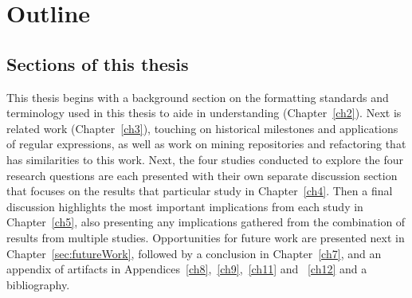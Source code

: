 \section{Outline}

\subsection{Sections of this thesis}
This thesis begins with a background section on the formatting standards and terminology used in this thesis to aide in understanding (Chapter~\ref{ch2}). Next is related work (Chapter~\ref{ch3}), touching on historical milestones and applications of regular expressions, as well as work on mining repositories and refactoring that has similarities to this work. Next, the four studies conducted to explore the four research questions are each presented with their own separate discussion section that focuses on the results that particular study in Chapter~\ref{ch4}.  Then a final discussion highlights the most important implications from each study in Chapter~\ref{ch5}, also presenting any implications gathered from the combination of results from multiple studies. Opportunities for future work are presented next in Chapter~\ref{sec:futureWork}, followed by a conclusion in Chapter~\ref{ch7}, and an appendix of artifacts in Appendices~\ref{ch8},~\ref{ch9},~\ref{ch11} and ~\ref{ch12} and a bibliography.
